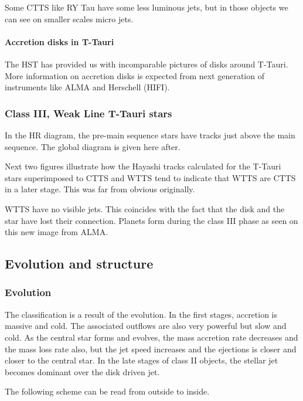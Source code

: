 \documentclass[10pt,a4paper,english]{article}
\begin{document}
Some CTTS like RY Tau have some less luminous jets, but in those objects we can see on smaller scales micro jets.

\paragraph{Accretion disks in T-Tauri}
The HST has provided us with incomparable pictures of disks around T-Tauri. More information on accretion disks is expected from next generation of instruments like ALMA and Herschell (HIFI).

\subsubsection{Class III, Weak Line T-Tauri stars}
In the HR diagram, the pre-main sequence stars have tracks just above the main sequence. The global diagram is given here after.


Next two figures illustrate how the Hayashi tracks calculated for the T-Tauri stars superimposed to CTTS and WTTS tend to indicate that WTTS are CTTS in a later stage. This was far from obvious originally.

WTTS have no visible jets. This coincides with the fact that the disk and the star have lost their connection. Planets form during the class III phase as seen on this new image from ALMA.

\subsection{Evolution and structure}

\subsubsection{Evolution}
The classification is a result of the evolution. In the first stages, accretion is massive and cold. The associated outflows are also very powerful but slow and cold. As the central star forms and evolves, the mass accretion rate decreases and the mass loss rate also, but the jet speed increases and the ejections is closer and closer to the central star. In the late stages of class II objects, the stellar jet becomes dominant over the disk driven jet.

The following scheme can be read from outside to inside.
\end{document}
